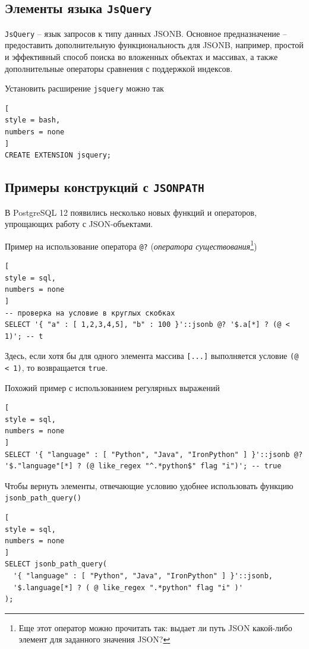\documentclass[%
	11pt,
	a4paper,
	utf8,
		]{article}
\begin{document}
\subsection{Элементы языка \texttt{JsQuery}}

\texttt{JsQuery} -- язык запросов к типу данных JSONB. Основное предназначение -- предоставить дополнительную функциональность для JSONB, например, простой и эффективный способ поиска во вложенных объектах и массивах, а также дополнительные операторы сравнения с поддержкой индексов.

Установить расширение \texttt{jsquery} можно так
\begin{lstlisting}[
style = bash,
numbers = none
]
CREATE EXTENSION jsquery;
\end{lstlisting}
 


\subsection{Примеры конструкций с \texttt{JSONPATH}}

В PostgreSQL 12 появились несколько новых функций и операторов, упрощающих работу с JSON-объектами.

Пример на использование оператора \verb|@?| (\emph{оператора существования}\footnote{Еще этот оператор можно прочитать так: выдает ли путь JSON какой-либо элемент для заданного значения JSON?})
\begin{lstlisting}[
style = sql, 
numbers = none
]
-- проверка на условие в круглых скобках
SELECT '{ "a" : [ 1,2,3,4,5], "b" : 100 }'::jsonb @? '$.a[*] ? (@ < 1)'; -- t
\end{lstlisting}

Здесь, если хотя бы для одного элемента массива \verb|[...]| выполняется условие \verb|(@ < 1)|, то возвращается \texttt{true}.

Похожий пример с использованием регулярных выражений
\begin{lstlisting}[
style = sql, 
numbers = none
]
SELECT '{ "language" : [ "Python", "Java", "IronPython" ] }'::jsonb @? '$."language"[*] ? (@ like_regex "^.*python$" flag "i")'; -- true
\end{lstlisting}

Чтобы вернуть элементы, отвечающие условию удобнее использовать функцию \verb|jsonb_path_query()|
\begin{lstlisting}[
style = sql, 
numbers = none
]
SELECT jsonb_path_query(
  '{ "language" : [ "Python", "Java", "IronPython" ] }'::jsonb,
  '$.language[*] ? ( @ like_regex ".*python" flag "i" )'
);
\end{lstlisting}
\end{document}
